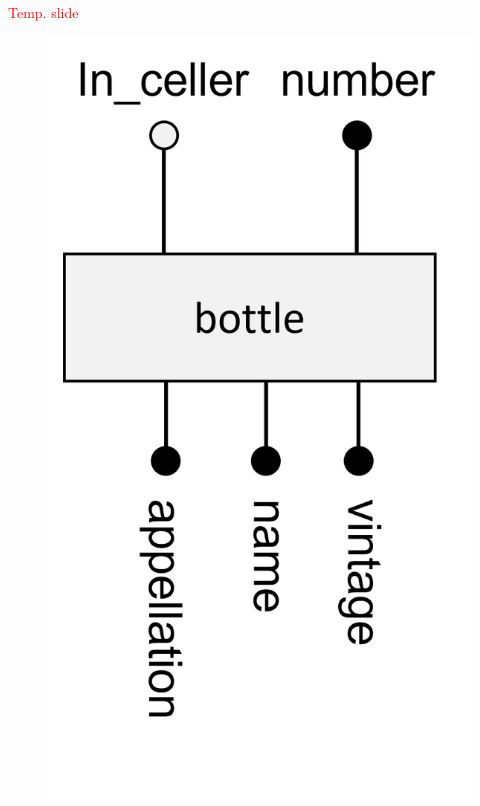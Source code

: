 \begin{frame}[fragile]{\textcolor{red}{Temp. slide}}
\begin{figure}
\begin{columns}
	\includegraphics[width=1\textwidth]{t4/images/bottle_entity_3fk.png}
\end{columns}
\end{figure}	
\end{frame}

